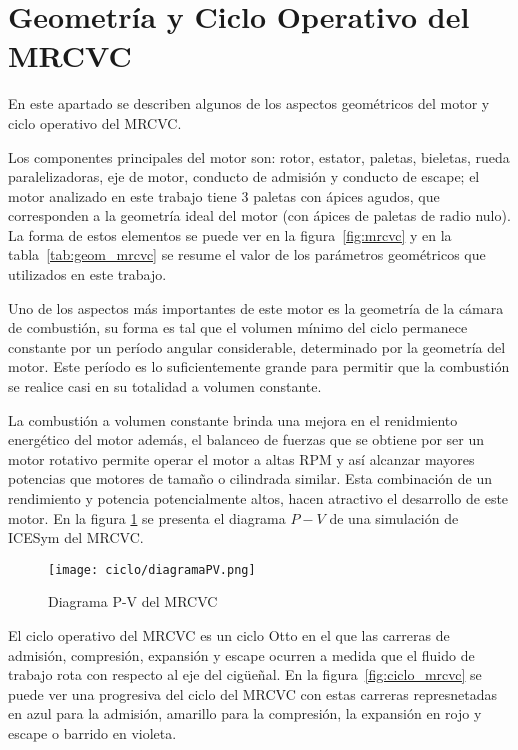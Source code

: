 \section{Geometría y Ciclo Operativo del MRCVC}
%
En este apartado se describen algunos de los aspectos geométricos del motor y
ciclo operativo del MRCVC.

Los componentes principales del motor son: rotor, estator, paletas, bieletas,
rueda paralelizadoras, eje de motor, conducto de admisión y conducto de escape;
el motor analizado en este trabajo tiene 3 paletas con ápices agudos, que
corresponden a la geometría ideal del motor (con ápices de paletas de radio
nulo).
%
La forma de estos elementos se puede ver en la figura~\ref{fig:mrcvc} y en la
tabla~\ref{tab:geom_mrcvc} se resume el valor de los parámetros geométricos que
utilizados en este trabajo.


Uno de los aspectos más importantes de este motor es la geometría de la cámara
de combustión, su forma es tal que el volumen mínimo del ciclo permanece
constante por un período angular considerable, determinado por la geometría del
motor.
%
Este período es lo suficientemente grande para permitir que la combustión se
realice casi en su totalidad a volumen constante.
%

La combustión a volumen constante brinda una mejora en el renidmiento energético
del motor además, el balanceo de fuerzas que se obtiene por ser un motor
rotativo permite operar el motor a altas RPM y así alcanzar mayores potencias
que motores de tamaño o cilindrada similar.
%
Esta combinación de un rendimiento y potencia potencialmente altos, hacen
atractivo el desarrollo de este motor.
%
En la figura \ref{fig:ciclo_pv_mrcvc} se presenta el diagrama $P-V$ de una
simulación de ICESym del MRCVC.
%
\begin{figure} \centering
    \texttt{[image: ciclo/diagramaPV.png]}
    \caption{Diagrama P-V del MRCVC}\label{fig:ciclo_pv_mrcvc}
\end{figure}


El ciclo operativo del MRCVC es un ciclo Otto en el que las carreras de
admisión, compresión, expansión y escape ocurren a medida que el fluido de
trabajo rota con respecto al eje del cigüeñal.
%
En la figura~\ref{fig:ciclo_mrcvc} se puede ver una progresiva del ciclo del
MRCVC con estas carreras represnetadas en azul para la admisión, amarillo para
la compresión, la expansión en rojo y escape o barrido en violeta.

